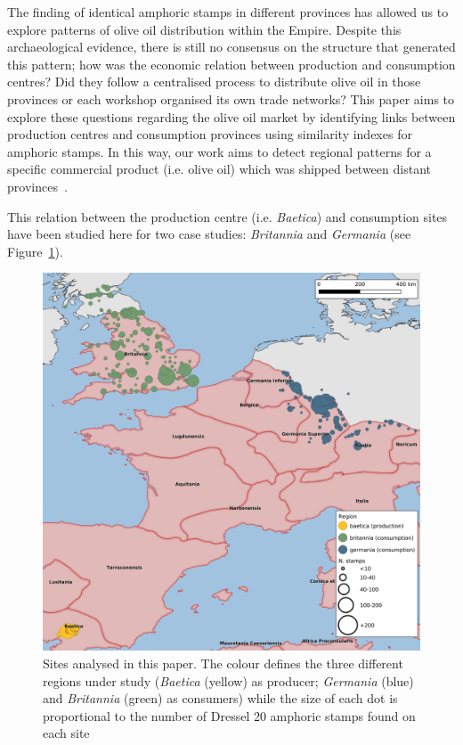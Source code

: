 The finding of identical amphoric stamps in different provinces has allowed us to explore patterns of olive oil distribution within the Empire. Despite this archaeological evidence, there is still no consensus on the structure that generated this pattern; how was the economic relation between production and consumption centres? Did they follow a centralised process to distribute olive oil in those provinces or each workshop organised its own trade networks?
This paper aims to explore these questions regarding the olive oil market by identifying links between production centres and consumption provinces using similarity indexes for amphoric stamps. In this way, our work aims to detect regional patterns for a specific commercial product (i.e. olive oil) which was shipped between distant provinces~\citep{isaksen_network_2006}. 

This relation between the production centre (i.e. \textit{Baetica}) and consumption sites have been studied here for two case studies: \textit{Britannia} and \textit{Germania} (see Figure~\ref{general}).

\begin{figure}[htp]
	\centering
\includegraphics[width=\linewidth]{general_map}
\caption{Sites analysed in this paper. The colour defines the three different regions under study (\textit{Baetica} (yellow) as producer; \textit{Germania} (blue) and \textit{Britannia} (green) as consumers) while the size of each dot is proportional to the number of Dressel 20 amphoric stamps found on each site}

\label{general}
\end{figure} 
        
